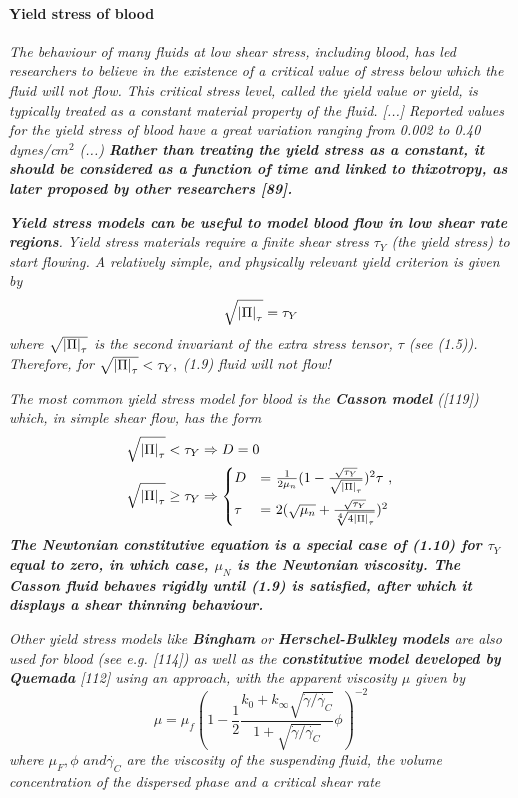 \documentclass[11pt,letterpaper]{article}
\begin{document}
\paragraph{Yield stress of blood} \textit{The behaviour of many fluids at low shear stress, including blood, has led researchers to believe in the existence of a critical value of stress below which the fluid will not flow. This critical stress level, called the yield value or yield, is typically treated as a constant material property of the fluid. [...] Reported values for the yield stress of blood have a great variation ranging from 0.002 to 0.40 dynes/c$m^2$ (...) \textbf{Rather than treating the yield stress as a constant, it should be considered as a function of time and linked to thixotropy, as later proposed by other researchers [89].}}

\textit{{\color{blue}\textbf{Yield stress models can be useful to model blood flow in low shear rate regions}}. Yield stress materials
require a finite shear stress $\tau_Y$ (the yield stress) to start flowing. A relatively simple, and physically relevant yield criterion is given by \begin{equation}
    \sqrt{\abs{\Pi}_{\tau}} = \tau_Y
\end{equation}
where $\sqrt{\abs{\Pi}_{\tau}}$ is the second invariant of the extra stress tensor, $\tau$  (see (1.5)). Therefore, for $ \sqrt{\abs{\Pi}_{\tau}} < \tau_Y,$ (1.9)
fluid will not flow!}


\textit{The most common yield stress model for blood is the {\color{red}\textbf{Casson model}} ([119]) which, in simple shear flow,
has the form\begin{align}
    \sqrt{\abs{\Pi}_{\tau}} < \tau_Y &\Rightarrow D=0 \\
    \sqrt{\abs{\Pi}_{\tau}} \geq \tau_Y &\Rightarrow  \begin{dcases*}
        D &= $\frac{1}{2\mu_n}(1- \frac{\sqrt{\tau_Y}}{ \sqrt{\abs{\Pi}_{\tau}}})^2\tau$ ,\\
        \tau &= $2(\sqrt{\mu_n}+\frac{\sqrt{\tau_Y}}{ \sqrt[4]{4\abs{\Pi}_{\tau}}})^2$
        \end{dcases*}
\end{align} \textbf{The Newtonian constitutive equation is a special case of (1.10) for $\tau_Y$ equal to zero, in which case, $\mu_N$ is the Newtonian viscosity. The Casson fluid behaves rigidly until (1.9) is satisfied, after which it displays a shear thinning behaviour.}} 


\textit{Other yield stress models like {\color{red}\textbf{Bingham}} or {\color{red}\textbf{Herschel-Bulkley models}} are also used for blood (see e.g.
[114]) as well as the {\color{red}\textbf{constitutive model developed by Quemada}} [112] using an approach, with the apparent viscosity $\mu$ given by
\begin{equation}
    \mu = \mu_f (1 -\frac{1}{2}\frac{k_0+k_{\infty}\sqrt{\Dot{\gamma}/\Dot{\gamma_C}}}{1+\sqrt{\Dot{\gamma}/\Dot{\gamma_C}}}\phi)^{-2}
\end{equation}
where $\mu_F, \phi \hspace{4pt }and \Dot{\gamma_C}$ are the viscosity of the suspending fluid, the volume concentration of the dispersed phase and a critical shear rate
}
\end{document}
